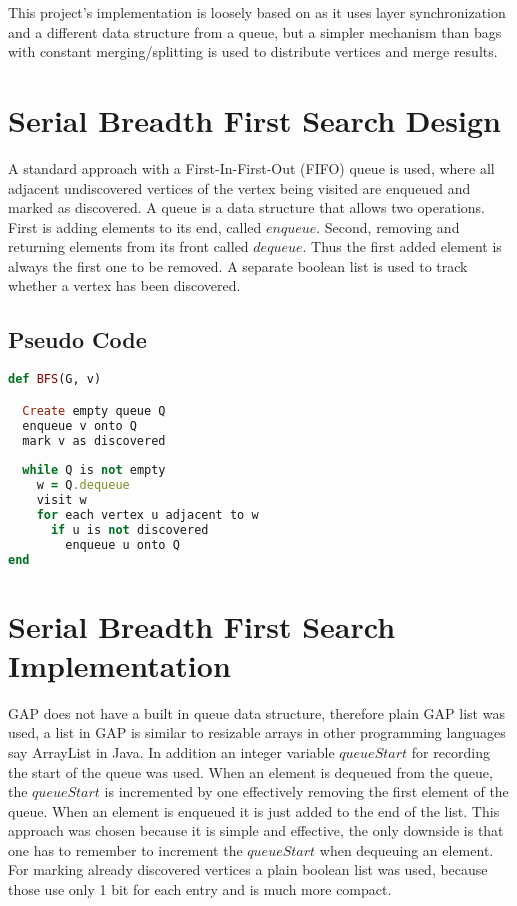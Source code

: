\documentclass{report}
\theoremstyle{plain}
\theoremstyle{definition}
\theoremstyle{remark}
\begin{document}
This project's implementation is loosely based on \cite{Leiserson} as it uses layer synchronization and a different data structure from a queue, but a simpler mechanism than bags with constant merging/splitting is used to distribute vertices and merge results.

\section{Serial Breadth First Search Design}
 
A standard approach with a First-In-First-Out (FIFO) queue is used, where all adjacent undiscovered vertices of the vertex being visited are enqueued and marked as discovered. A queue is a data structure that allows two operations. First is adding elements to its end, called $enqueue$. Second, removing and returning elements from its front called $dequeue$. Thus the first added element is always the first one to be removed. A separate boolean list is used to track whether a vertex has been discovered.

\subsection*{Pseudo Code}

\begin{lstlisting}[language=Ruby]
def BFS(G, v)

  Create empty queue Q
  enqueue v onto Q
  mark v as discovered
  
  while Q is not empty
    w = Q.dequeue
    visit w
    for each vertex u adjacent to w
      if u is not discovered
        enqueue u onto Q
end
\end{lstlisting}

\section{Serial Breadth First Search Implementation}

GAP does not have a built in queue data structure, therefore plain GAP list was used, a list in GAP is similar to resizable arrays in other programming languages say ArrayList in Java. In addition an integer variable $queueStart$ for recording the start of the queue was used. When an element is dequeued from the queue, the $queueStart$ is incremented by one effectively removing the first element of the queue. When an element is enqueued it is just added to the end of the list. This approach was chosen because it is simple and effective, the only downside is that one has to remember to increment the $queueStart$ when dequeuing an element. For marking already discovered vertices a plain boolean list was used, because those use only 1 bit for each entry and is much more compact.
\end{document}
